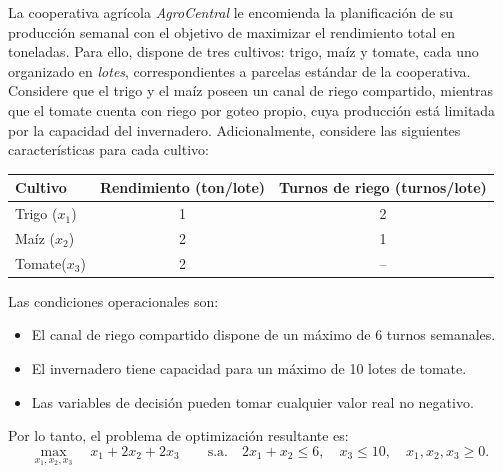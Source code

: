 La cooperativa agrícola \textit{AgroCentral} le encomienda la planificación de su producción semanal con el objetivo de  maximizar el rendimiento total en toneladas. Para ello, dispone de tres cultivos: trigo, maíz y tomate, cada uno organizado en \textit{lotes}, correspondientes a parcelas estándar de la cooperativa. Considere que el trigo y el maíz poseen un canal de riego compartido, mientras que el tomate
cuenta con riego por goteo propio, cuya producción está limitada por la capacidad del invernadero. Adicionalmente, considere las siguientes características para cada
cultivo:

\medskip
\begin{center}
\renewcommand{\arraystretch}{1.3}
\begin{tabular}{lcc}
  \toprule
  \textbf{Cultivo} & \textbf{Rendimiento (ton/lote)} &
  \textbf{Turnos de riego (turnos/lote)} \\
  \midrule
  Trigo \;($x_1$)  & 1 & 2  \\
  Maíz  \;($x_2$)  & 2 & 1  \\
  Tomate\;($x_3$)  & 2 & -- \\
  \bottomrule
\end{tabular}
\end{center}

\medskip
Las condiciones operacionales son:
\begin{itemize}[leftmargin=1.5em]
  \item El canal de riego compartido dispone de un máximo de 6 turnos semanales.
  \item El invernadero tiene capacidad para un máximo de 10 lotes de tomate.
  \item Las variables de decisión pueden tomar cualquier valor real no negativo.
\end{itemize}

Por lo tanto, el problema de optimización resultante es:
\begin{equation}
  \max_{x_1,x_2,x_3}\quad x_1 + 2x_2 + 2x_3
  \qquad \text{s.a.}\quad
  2x_1 + x_2 \le 6,\quad
  x_3 \le 10,\quad
  x_1,x_2,x_3 \ge 0.
  \label{ex:4:3:eq:primal}
\end{equation}

